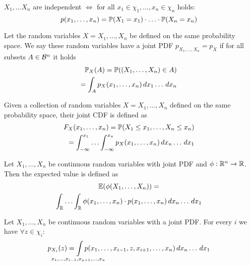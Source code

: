 \begin{proposition}
  \(X_1, \ldots X_n\) are independent \(\iff\) for all \(x_1 \in \chi_1, \ldots, x_n \in \chi_n\) holds: \[p(x_1, \ldots, x_n) = \P(X_1 = x_1) \cdot \ldots \cdot \P(X_n = x_n)\]
\end{proposition}

\begin{cdefinition*}
  Let the random variables \(X = X_1, \ldots, X_n\) be defined on the same probability space. We say these random variables have a joint PDF \(p_{X_1, \ldots, X_n} = p_X\) if for all subsets \(A \in \B^n\) it holds
  \begin{align*}
    \P_X(A) = \P((X_1, \ldots, X_n) \in A) \\
    = \int_A p_X(x_1, \ldots, x_n) \, dx_1 \ldots \,dx_n
  \end{align*}
\end{cdefinition*}

\begin{cdefinition*}
  Given a collection of random variables \(X = X_1, \ldots, X_n\) defined on the same probability space, their joint CDF is defined as
  \begin{align*}
    F_{X}(x_1, \ldots, x_n) = \P(X_1 \leq x_1, \ldots, X_n \leq x_n) \\
    = \int_{-\infty}^{x_1} \ldots \int_{-\infty}^{x_n} p_{X}(x_1, \ldots, x_n) \,dx_n \ldots \, dx_1
  \end{align*}
\end{cdefinition*}

\begin{proposition}
  Let \(X_1, \ldots, X_n\) be continuous random variables with joint PDF and \(\phi: \R^n \to \R\). Then the expected value is defined as
  \begin{multline*}
    \E(\phi(X_1, \ldots, X_n)) = \\ \int_\R \ldots \int_\R \phi(x_1, \ldots, x_n) \cdot p(x_1, \ldots, x_n) \, dx_n \ldots \, dx_1
  \end{multline*}
\end{proposition}

\begin{ctheorem*}
  Let \(X_1, \ldots, X_n\) be continuous random variables with a joint PDF. For every \(i\) we have \(\forall z \in \chi_i\):
  \[p_{X_i}(z) = \smashoperator{\int_{x_1, \ldots, x_{i-1}, x_{x+1}, \ldots, x_n}} p(x_1, \ldots, x_{i-1}, z, x_{i+1}, \ldots, x_n) \, dx_n \ldots \, dx_1\]
\end{ctheorem*}


